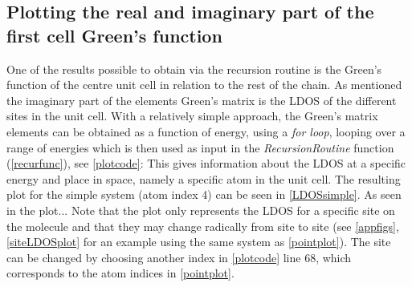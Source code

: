 \subsection{Plotting the real and imaginary part of the first cell Green's function}
One of the results possible to obtain via the recursion routine is the Green's function of the centre unit cell in relation to the rest of the chain. As mentioned the imaginary part of the elements Green's matrix is the LDOS of the different sites in the unit cell. With a relatively simple approach, the Green's matrix elements can be obtained as a function of energy, using a \textit{for loop}, looping over a range of energies which is then used as input in the \textit{RecursionRoutine} function (\cref{recurfunc}), see \cref{plotcode}:
\vspace{-1\baselineskip}
\vspace{\baselineskip}
This gives information about the LDOS at a specific energy and place in space, namely a specific atom in the unit cell. The resulting plot for the simple system (atom index 4) can be seen in \cref{LDOSsimple}. As seen in the plot... Note that the plot only represents the LDOS for a specific site on the molecule and that they may change radically from site to site (see \cref{appfigs}, \cref{siteLDOSplot} for an example using the same system as \cref{pointplot}). The site can be changed by choosing another index in \cref{plotcode} line 68, which corresponds to the atom indices in \cref{pointplot}.
